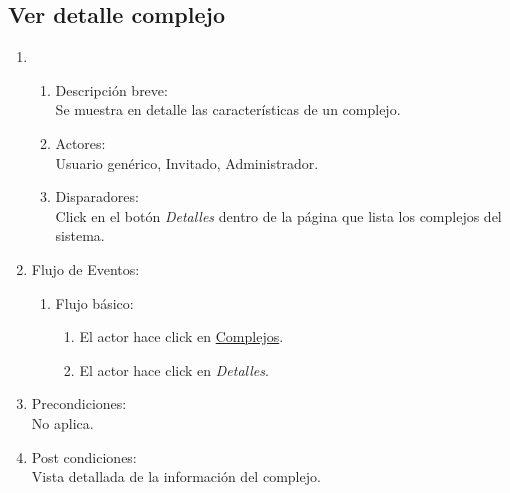 \documentclass[a4paper,11pt]{article}
\begin{document}
\subsection{Ver detalle complejo}
\begin{enumerate}

    \item
    \begin{enumerate}
    \item Descripci\'on breve: \\
        Se muestra en detalle las caracter\'isticas de un complejo.
    \item Actores: \\
        Usuario gen\'erico, Invitado, Administrador.
   \item Disparadores: \\
        Click en el bot\'on \emph{Detalles} dentro de la
        p\'agina que lista los complejos del sistema.
    \end{enumerate}

    \item Flujo de Eventos:

    \begin{enumerate}

        \item Flujo b\'asico:
	\begin{enumerate}
        	\item El actor hace click en \underline{Complejos}. 
		\item El actor hace click en \emph{Detalles}.
	\end{enumerate}

    \end{enumerate}

    \item Precondiciones: \\
        No aplica.

    \item Post condiciones: \\
        Vista detallada de la informaci\'on del complejo.

\end{enumerate}

\end{document}
